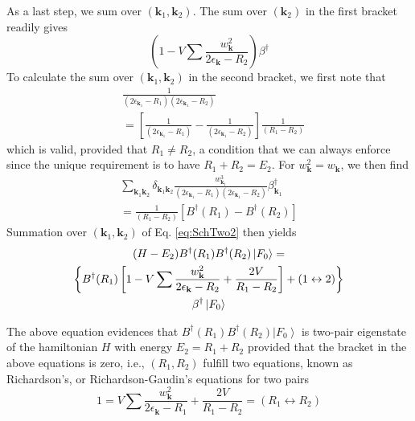 \documentclass[epj]{svjour}
\newcommand{\vk}{\ensuremath{\mathbf{k}}}
\begin{document}
As a last step, we sum over $(\vk_1,\vk_2)$.  The sum over $(\vk_2)$ in the first bracket readily gives 
\begin{equation}\label{eq:1-v}
\left(1-V\sum\frac{w_{\mathbf{k} }^2}{2\epsilon_{\mathbf{k} }-R_2}\right)\beta^\dagger
\end{equation}
To calculate the sum over $(\vk_1,\vk_2)$ in the second bracket, we first note that
\begin{equation}\label{eq:inverse}
\begin{split}
&\frac{1}{\left(2\epsilon_{\mathbf{k} _1}-R_1\right)
\left(2\epsilon_{\mathbf{k} _1}-R_2\right)}\\&=\left[
\frac{1}{\left(2\epsilon_{\mathbf{k} _1}-R_1\right)}-\frac{1}{\left(2\epsilon_{\mathbf{k}
_1}-R_2\right) }\right]\frac1{\left(R_1-R_2\right) } 
\end{split}
\end{equation}
which is valid, provided that $R_1\neq{}R_2$,
a condition that we can always enforce since the unique requirement is to have $R_1+R_2=E_2$. For $w^2_{{\mathbf{k} }}=w_{{\mathbf{k} }}$, we then find 
\begin{multline}\label{eq:deltakk}
\sum_{{\mathbf{k} _1}{\mathbf{k} _2}}\delta_{{\mathbf{k} _1}{\mathbf{k} _2}}\frac{w^3_{{\mathbf{k} _1}}}{\left(2%
\epsilon_{\mathbf{k} _1}-R_1\right) \left(2\epsilon_{\mathbf{k}
_1}-R_2\right)}\beta^\dagger_{{\mathbf{k} _1}}\\=\frac1{\left(R_1-R_2\right) }[B^\dagger(R_1)-B^\dagger(R_2)]
\end{multline}
 Summation over $(\vk_1,\vk_2)$ of Eq. \eqref{eq:SchTwo2} then yields 
\begin{multline}  \label{eq:SchTwo3}
(H-E_2)B^{\dagger}(R_1)B^{\dagger}(R_2)\left|F_0\right>   = \\
\left\{B^{\dagger}(R_1)\left[1-V\sum\frac{w_{\mathbf{k} }^2}{2\epsilon_{%
\mathbf{k} }-R_2}+\frac{2V}{R_1-R_2}\right] +(1\leftrightarrow2)\right\}  \\
\beta^{\dagger}\left|F_0\right>  
\end{multline}


The above equation evidences that $B^{\dagger}(R_1)B^{\dagger}(R_2)%
\left|F_0\right>  $ is two-pair eigenstate of the hamiltonian $H$ with  energy $%
E _2=R_1+R_2$ provided that the bracket in the above equations is zero, i.e., $\left(R_1,R_2\right) $ fulfill two
equations, known as Richardson's, or Richardson-Gaudin's equations for two pairs 
\begin{equation}
1=V\sum\frac{w_{\mathbf{k} }^2}{2\epsilon_{\mathbf{k} }-R_1}+\frac{2V}{R_1-R_2}%
=(R_1\leftrightarrow{}R_2)
\end{equation}
\end{document}
